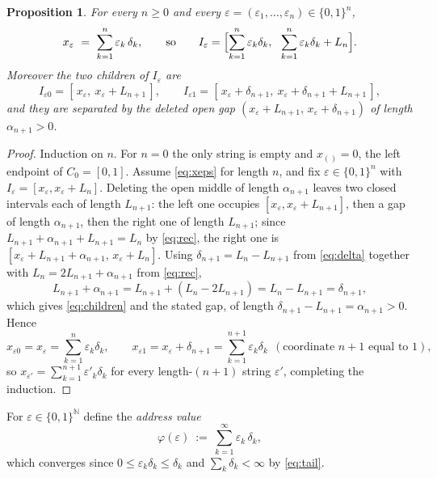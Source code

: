 \documentclass{amsart}
\newtheorem{proposition}{Proposition}
\theoremstyle{definition}
\theoremstyle{remark}
\begin{document}
\begin{proposition}\label{prop:endpoint}
For every $n\ge0$ and every $\varepsilon=(\varepsilon_1,\dots,\varepsilon_n)\in\{0,1\}^n$,
\begin{equation}\label{eq:xeps}
x_\varepsilon\ =\ \sum_{k=1}^{n}\varepsilon_k\,\delta_k ,
\qquad\text{so}\qquad
I_\varepsilon=\Bigl[\sum_{k=1}^{n}\varepsilon_k\delta_k,\ \
\sum_{k=1}^{n}\varepsilon_k\delta_k+L_n\Bigr].
\end{equation}
Moreover the two children of $I_\varepsilon$ are
\begin{equation}\label{eq:children}
I_{\varepsilon0}=[\,x_\varepsilon,\ x_\varepsilon+L_{n+1}\,],
\qquad
I_{\varepsilon1}=[\,x_\varepsilon+\delta_{n+1},\ x_\varepsilon+\delta_{n+1}+L_{n+1}\,],
\end{equation}
and they are separated by the deleted open gap $(x_\varepsilon+L_{n+1},\,x_\varepsilon+\delta_{n+1})$ of length $\alpha_{n+1}>0$.
\end{proposition}

\begin{proof}
Induction on $n$. For $n=0$ the only string is empty and $x_{()}=0$, the left
endpoint of $C_0=[0,1]$. Assume \eqref{eq:xeps} for length $n$, and fix
$\varepsilon\in\{0,1\}^n$ with $I_\varepsilon=[x_\varepsilon,x_\varepsilon+L_{n}]$.
Deleting the open middle of length $\alpha_{n+1}$ leaves two closed intervals each
of length $L_{n+1}$: the left one occupies $[x_\varepsilon,x_\varepsilon+L_{n+1}]$,
then a gap of length $\alpha_{n+1}$, then the right one of length $L_{n+1}$; since
$L_{n+1}+\alpha_{n+1}+L_{n+1}=L_n$ by \eqref{eq:rec}, the right one is
$[x_\varepsilon+L_{n+1}+\alpha_{n+1},\,x_\varepsilon+L_n]$. Using
$\delta_{n+1}=L_n-L_{n+1}$ from \eqref{eq:delta} together with
$L_n=2L_{n+1}+\alpha_{n+1}$ from \eqref{eq:rec},
\[
L_{n+1}+\alpha_{n+1}=L_{n+1}+(L_n-2L_{n+1})=L_n-L_{n+1}=\delta_{n+1},
\]
which gives \eqref{eq:children} and the stated gap, of length
$\delta_{n+1}-L_{n+1}=\alpha_{n+1}>0$. Hence
\[
x_{\varepsilon0}=x_\varepsilon=\sum_{k=1}^{n}\varepsilon_k\delta_k,
\qquad
x_{\varepsilon1}=x_\varepsilon+\delta_{n+1}=\sum_{k=1}^{n+1}\varepsilon_k\delta_k
\ \ (\text{coordinate }n{+}1\text{ equal to }1),
\]
so $x_{\varepsilon'}=\sum_{k=1}^{n+1}\varepsilon'_k\delta_k$ for every length-$(n+1)$
string $\varepsilon'$, completing the induction.
\end{proof}

For $\varepsilon\in\{0,1\}^{\mathbb N}$ define the \emph{address value}
\begin{equation}\label{eq:phi}
\varphi(\varepsilon)\ :=\ \sum_{k=1}^{\infty}\varepsilon_k\,\delta_k ,
\end{equation}
which converges since $0\le\varepsilon_k\delta_k\le\delta_k$ and
$\sum_k\delta_k<\infty$ by \eqref{eq:tail}.
\end{document}
